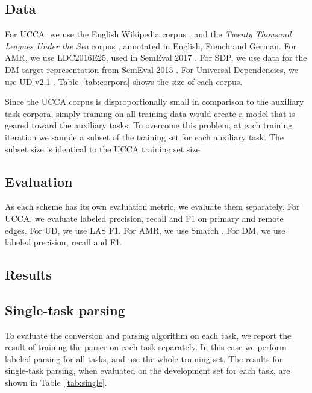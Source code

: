 \documentclass[11pt,a4paper]{article}
\begin{document}
\subsection{Data}\label{sec:data}

For UCCA, we use the English Wikipedia corpus \cite{abend2013universal},
and the \textit{Twenty Thousand Leagues Under the Sea} corpus \cite[20K leagues;][]{sulem2015conceptual},
annotated in English, French and German.
For AMR, we use LDC2016E25, used in SemEval 2017 \cite{may2017semeval}.
For SDP, we use data for the DM target representation from SemEval 2015 \cite{oepen2015semeval}.
For Universal Dependencies, we use UD v2.1 \cite{11234/1-2515}.
Table~\ref{tab:corpora} shows the size of each corpus.

Since the UCCA corpus is disproportionally small in comparison to the auxiliary task corpora,
simply training on all training data would create a model that is geared toward the auxiliary tasks.
To overcome this problem,
at each training iteration we sample a subset of the training set for each auxiliary task.
The subset size is identical to the UCCA training set size.


\subsection{Evaluation}\label{sec:evaluation}

As each scheme has its own evaluation metric, we evaluate them separately.
For UCCA, we evaluate labeled precision, recall and F1 on primary and remote edges.
For UD, we use LAS F1.
For AMR, we use Smatch \cite{cai2013smatch}.
For DM, we use labeled precision, recall and F1.


\subsection{Results}\label{sec:results}




\subsection{Single-task parsing}\label{sec:results_single}

To evaluate the conversion and parsing algorithm on each task, we report the result
of training the parser on each task separately.
In this case we perform labeled parsing for all tasks, and use the whole training set.
The results for single-task parsing, when evaluated on the development set for each task,
are shown in Table~\ref{tab:single}.
\end{document}
